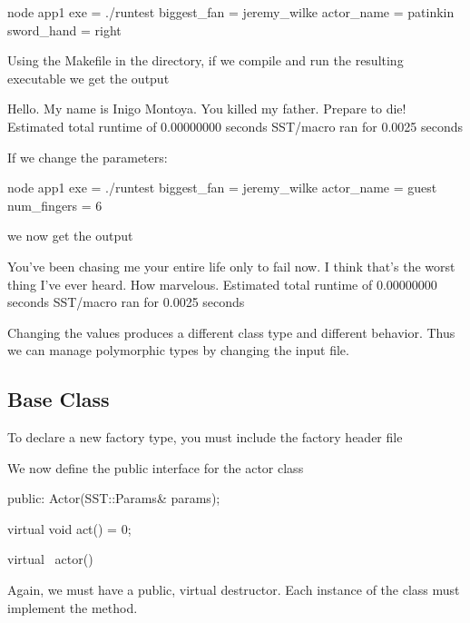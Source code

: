 \begin{ViFile}
node {
 app1 {
  exe = ./runtest
  biggest_fan = jeremy_wilke
  actor_name = patinkin
  sword_hand = right
 }
}
\end{ViFile}

Using the Makefile in the directory, if we compile and run the resulting executable we get the output

\begin{ViFile}
Hello. My name is Inigo Montoya. You killed my father. Prepare to die!
Estimated total runtime of           0.00000000 seconds
SST/macro ran for       0.0025 seconds
\end{ViFile}

If we change the parameters:

\begin{ViFile}
node {
 app1 {
  exe = ./runtest
  biggest_fan = jeremy_wilke
  actor_name = guest
  num_fingers = 6
 }
}
\end{ViFile}

we now get the output

\begin{ViFile}
You've been chasing me your entire life only to fail now.
I think that's the worst thing I've ever heard. How marvelous.
Estimated total runtime of           0.00000000 seconds
SST/macro ran for       0.0025 seconds
\end{ViFile}

Changing the values produces a different class type and different behavior.
Thus we can manage polymorphic types by changing the input file.

\subsection{Base Class}\label{subsec:baseClass}
To declare a new factory type, you must include the factory header file

\begin{CppCode}
#include <sprockit/factories/factory.h>

namespace sstmac {
    namespace tutorial {

class Actor {
\end{CppCode}


We now define the public interface for the actor class

\begin{CppCode}
 public:
  Actor(SST::Params& params);
  
  virtual void act() = 0;

  virtual ~actor(){}
\end{CppCode}
Again, we must have a public, virtual destructor.
Each instance of the  class must implement the  method.

